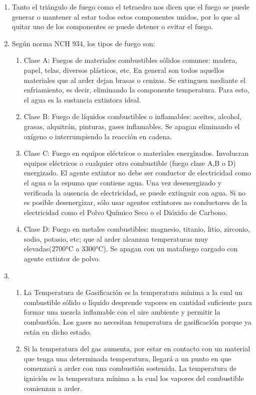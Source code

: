 \begin{enumerate}
  \item Tanto el triángulo de fuego como el tetraedro nos dicen que el fuego se puede generar o mantener al estar todos estos componentes unidos, por lo que al quitar uno de los componentes se puede detener o evitar el fuego.
  
  \item Según norma NCH 934, los tipos de fuego son: %
  \begin{enumerate}
      \item Clase A: Fuegos de materiales combustibles sólidos comunes: madera, papel, telas, diversos plásticos, etc. En general son todos aquellos materiales que al arder dejan brasas o cenizas. Se extinguen mediante el enfriamiento, es decir, eliminando la componente temperatura. Para esto, el agua es la sustancia extintora ideal.
      \item Clase B: Fuego de líquidos combustibles o inflamables: aceites, alcohol, grasas, alquitrán, pinturas, gases inflamables. Se apagan eliminando el oxígeno o interrumpiendo la reacción en cadena.
      \item Clase C: Fuego en equipos eléctricos o materiales energizados. Involucran equipos eléctricos o cualquier otro combustible (fuego clase A,B o D) energizado. El agente extintor no debe ser conductor de electricidad como el agua o la espuma que contiene agua. Una vez desenergizado y verificada la ausencia de electricidad, se puede extinguir con agua. Si no es posible desenergizar, sólo usar agentes extintores no conductores de la electricidad como el Polvo Químico Seco o el Dióxido de Carbono.
      \item Clase D: Fuego en metales combustibles:  magnesio, titanio, litio, zirconio,  sodio, potasio, etc; que al arder alcanzan temperaturas muy elevadas(2700°C a 3300°C).  Se apagan con un matafuego cargado con agente extintor de polvo.
  \end{enumerate}
  \item %
  \begin{enumerate}
      \item La Temperatura de Gasificación es la temperatura mínima a la cual un combustible sólido o líquido desprende vapores en cantidad suficiente para formar una mezcla inflamable con el aire ambiente y permitir la combustión. Los gases no necesitan temperatura de gasificación porque ya están en dicho estado.
      \item Si la temperatura del gas aumenta, por estar en contacto con un material que tenga una determinada temperatura, llegará a un punto en que comenzará a arder con una combustión sostenida.  La temperatura de ignición es la temperatura mínima a la cual los vapores del combustible comienzan a arder.

\end{enumerate}
\end{enumerate}
